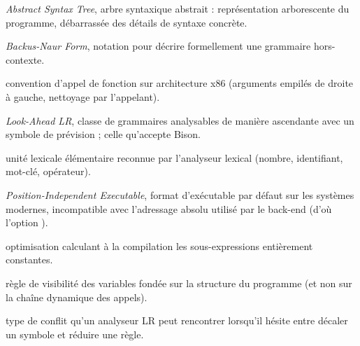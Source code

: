 \begin{description}[style=nextline,leftmargin=1em]
  \item[AST] \emph{Abstract Syntax Tree}, arbre syntaxique abstrait :
        représentation arborescente du programme, débarrassée des détails de
        syntaxe concrète.
  \item[BNF] \emph{Backus-Naur Form}, notation pour décrire formellement une
        grammaire hors-contexte.
  \item[cdecl] convention d'appel de fonction sur architecture x86 (arguments
        empilés de droite à gauche, nettoyage par l'appelant).
  \item[LALR(1)] \emph{Look-Ahead LR}, classe de grammaires analysables de manière
        ascendante avec un symbole de prévision ; celle qu'accepte Bison.
  \item[Lexème / token] unité lexicale élémentaire reconnue par l'analyseur
        lexical (nombre, identifiant, mot-clé, opérateur).
  \item[PIE] \emph{Position-Independent Executable}, format d'exécutable par
        défaut sur les systèmes modernes, incompatible avec l'adressage absolu
        utilisé par le back-end (d'où l'option ).
  \item[Pliage de constantes] optimisation calculant à la compilation les
        sous-expressions entièrement constantes.
  \item[Portée lexicale] règle de visibilité des variables fondée sur la structure
        du programme (et non sur la chaîne dynamique des appels).
  \item[Shift/reduce] type de conflit qu'un analyseur LR peut rencontrer lorsqu'il
        hésite entre décaler un symbole et réduire une règle.
\end{description}
